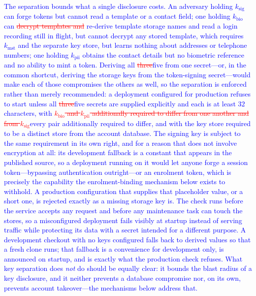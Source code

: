 \documentclass[10pt,journal,compsoc]{IEEEtran}
\begin{document}
{\textcolor{blue}{The separation bounds what a single disclosure costs. An adversary holding $k_{\text{sig}}$ can forge tokens but cannot read a template or a contact field; one holding $k_{\text{bio}}$ can \textcolor{red}{\sout{decrypt templates and}} re-derive \textcolor{revpink}{template} storage names \textcolor{revpink}{and read a login recording still in flight, but cannot decrypt any stored template, which requires $k_{\text{mst}}$ and the separate key store,} but learns nothing about addresses or telephone numbers; one holding $k_{\text{pii}}$ obtains the contact details but no biometric reference and no ability to mint a token. Deriving all \textcolor{red}{\sout{three}}\textcolor{revpink}{five} from one secret---or, in the common shortcut, deriving the storage keys from the token-signing secret---would make each of those compromises the others as well, so the separation is enforced rather than merely recommended: a deployment configured for production refuses to start unless all \textcolor{red}{\sout{three}}\textcolor{revpink}{five} secrets are supplied explicitly and each is at least $32$ characters, with \textcolor{red}{\sout{$k_{\text{bio}}$ and $k_{\text{pii}}$ additionally required to differ from one another and from $k_{\text{sig}}$}}\textcolor{revpink}{every pair additionally required to differ, and with the key store required to be a distinct store from the account database}. The signing key is subject to the same requirement in its own right, and for a reason that does not involve encryption at all: its development fallback is a constant that appears in the published source, so a deployment running on it would let anyone forge a session token---bypassing authentication outright---or an enrolment token, which is precisely the capability the enrolment-binding mechanism below exists to withhold. A production configuration that supplies that placeholder value, or a short one, is rejected exactly as a missing storage key is. The check runs before the service accepts any request and before any maintenance task can touch the stores, so a misconfigured deployment fails visibly at startup instead of serving traffic while protecting its data with a secret intended for a different purpose. A development checkout with no keys configured falls back to derived values so that a fresh clone runs; that fallback is a convenience for development only, is announced on startup, and is exactly what the production check refuses. What key separation does \emph{not} do should be equally clear: it bounds the blast radius of a key disclosure, and it neither prevents a database compromise nor, on its own, prevents account takeover---the mechanisms below address that.}

}
\end{document}

